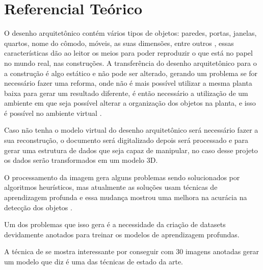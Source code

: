 \chapter{Referencial Teórico}\label{cp:refteory}
\ABNTEXchapterfont


O desenho arquitetônico  contém vários tipos de objetos: paredes, portas, janelas, quartos, nome do cômodo, móveis, as suas dimensões,  entre outros%
, essas características dão ao leitor os meios para poder reproduzir o que está no papel no mundo real, nas construções. A transferência do desenho arquitetônico para o a construção é algo estático e não pode ser alterado, gerando um problema se for necessário fazer uma reforma, onde não é mais possível utilizar a mesma planta baixa para gerar um resultado diferente, é então necessário a utilização de um ambiente em que seja possível alterar a organização dos objetos na planta, e isso é possível no ambiente virtual \cite{lv2021residential}.

Caso não tenha o modelo virtual do desenho arquitetônico será necessário fazer a sua reconstrução, o documento será digitalizado depois será processado e para gerar uma estrutura de dados que seja capaz de manipular, no caso desse projeto os dados serão transformados em um modelo 3D.

O processamento da imagem gera alguns problemas sendo solucionados por algoritmos heurísticos, mas atualmente as soluções usam técnicas de aprendizagem profunda \iffalse referênciar? \fi e essa mudança mostrou uma melhora na acurácia na detecção dos objetos \cite{3dplanet2021}.

Um dos problemas que isso gera é a necessidade da criação de datasets devidamente anotados para treinar os modelos de aprendizagem profundas.

A técnica de \cite{3dplanet2021} se mostra interessante por conseguir com 30 imagens anotadas gerar um modelo que \cite{kratochvila2024multi} diz é uma das técnicas de estado da arte.

